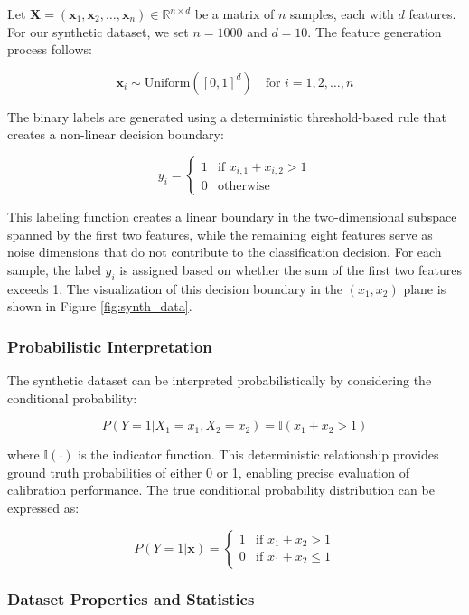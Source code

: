 \documentclass[12pt, a4paper]{article}
\begin{document}
Let $\mathbf{X} = (\mathbf{x}_1, \mathbf{x}_2, \ldots, \mathbf{x}_n) \in \mathbb{R}^{n \times d}$ be a matrix of $n$ samples, each with $d$ features. For our synthetic dataset, we set $n = 1000$ and $d = 10$. The feature generation process follows:

$$\mathbf{x}_i \sim \text{Uniform}([0,1]^d) \quad \text{for } i = 1, 2, \ldots, n$$

The binary labels are generated using a deterministic threshold-based rule that creates a non-linear decision boundary:

$$y_i = \begin{cases} 
1 & \text{if } x_{i,1} + x_{i,2} > 1 \\
0 & \text{otherwise}
\end{cases}$$

This labeling function creates a linear boundary in the two-dimensional subspace spanned by the first two features, while the remaining eight features serve as noise dimensions that do not contribute to the classification decision. For each sample, the label $y_i$ is assigned based on whether the sum of the first two features exceeds 1. 
The visualization of this decision boundary in the $(x_1, x_2)$ plane is shown in Figure \ref{fig:synth_data}.

\subsubsection{Probabilistic Interpretation}

The synthetic dataset can be interpreted probabilistically by considering the conditional probability:

$$P(Y = 1 | X_1 = x_1, X_2 = x_2) = \mathbb{I}(x_1 + x_2 > 1)$$

where $\mathbb{I}(\cdot)$ is the indicator function. This deterministic relationship provides ground truth probabilities of either 0 or 1, enabling precise evaluation of calibration performance. The true conditional probability distribution can be expressed as:

$$P(Y = 1 | \mathbf{x}) = \begin{cases}
1 & \text{if } x_1 + x_2 > 1 \\
0 & \text{if } x_1 + x_2 \leq 1
\end{cases}$$

\subsubsection{Dataset Properties and Statistics}
\end{document}

